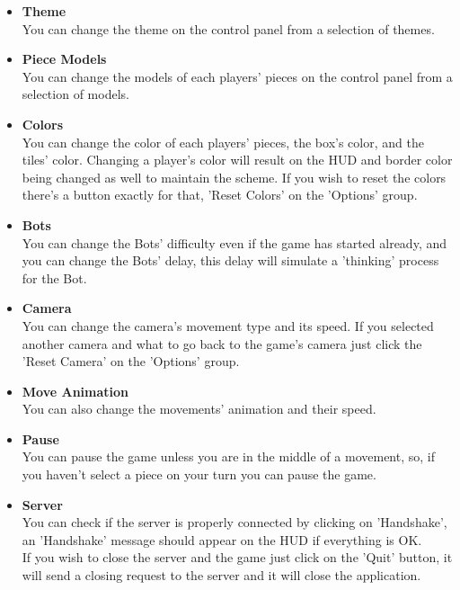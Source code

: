 \begin{itemize}
    \begin{itemize}
        \item \textbf{Theme}\\
        \noindent You can change the theme on the control panel from a selection of themes.
        \item \textbf{Piece Models}\\
        \noindent You can change the models of each players' pieces on the control panel from a selection of models.
        \item \textbf{Colors}\\
        \noindent You can change the color of each players' pieces, the box's color, and the tiles' color.
        Changing a player's color will result on the HUD and border color being changed as well to maintain the scheme.
        If you wish to reset the colors there's a button exactly for that, 'Reset Colors' on the 'Options' group.
        \item \textbf{Bots}\\
        \noindent You can change the Bots' difficulty even if the game has started already, and you can change the Bots' delay, this delay will simulate a 'thinking' process for the Bot.
        \item \textbf{Camera}\\
        \noindent You can change the camera's movement type and its speed.
        If you selected another camera and what to go back to the game's camera just click the 'Reset Camera' on the 'Options' group.
        \item \textbf{Move Animation}\\
        \noindent You can also change the movements' animation and their speed.
        \item \textbf{Pause}\\
        \noindent You can pause the game unless you are in the middle of a movement, so, if you haven't select a piece on your turn you can pause the game.
        \item \textbf{Server}\\
        \noindent You can check if the server is properly connected by clicking on 'Handshake', an 'Handshake' message should appear on the HUD if everything is OK.\\
        \noindent If you wish to close the server and the game just click on the 'Quit' button, it will send a closing request to the server and it will close the application.
    \end{itemize}

\end{itemize}
